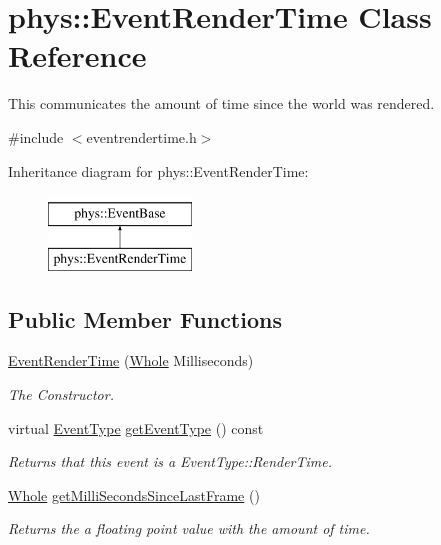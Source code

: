 \hypertarget{classphys_1_1EventRenderTime}{
\section{phys::EventRenderTime Class Reference}
\label{d3/d8b/classphys_1_1EventRenderTime}
}


This communicates the amount of time since the world was rendered.  




{\ttfamily \#include $<$eventrendertime.h$>$}

Inheritance diagram for phys::EventRenderTime:\begin{figure}[H]
\begin{center}
\leavevmode
\includegraphics[height=2cm]{d3/d8b/classphys_1_1EventRenderTime}
\end{center}
\end{figure}
\subsection*{Public Member Functions}
\begin{DoxyCompactItemize}
\item 
\hyperlink{classphys_1_1EventRenderTime_af2384f7b09bbea42dcd2539a9e1747fd}{EventRenderTime} (\hyperlink{namespacephys_a460f6bc24c8dd347b05e0366ae34f34a}{Whole} Milliseconds)
\begin{DoxyCompactList}\small\item\em The Constructor. \item\end{DoxyCompactList}\item 
virtual \hyperlink{classphys_1_1EventBase_a5e6a8564e127f654123f0bf6a2751923}{EventType} \hyperlink{classphys_1_1EventRenderTime_a76a47983d5aa197104cc3c0b9dea9dfa}{getEventType} () const 
\begin{DoxyCompactList}\small\item\em Returns that this event is a EventType::RenderTime. \item\end{DoxyCompactList}\item 
\hyperlink{namespacephys_a460f6bc24c8dd347b05e0366ae34f34a}{Whole} \hyperlink{classphys_1_1EventRenderTime_ac9f20f13bf1f6e542151be2ce8ea2fa4}{getMilliSecondsSinceLastFrame} ()
\begin{DoxyCompactList}\small\item\em Returns the a floating point value with the amount of time. \item\end{DoxyCompactList}\end{DoxyCompactItemize}


